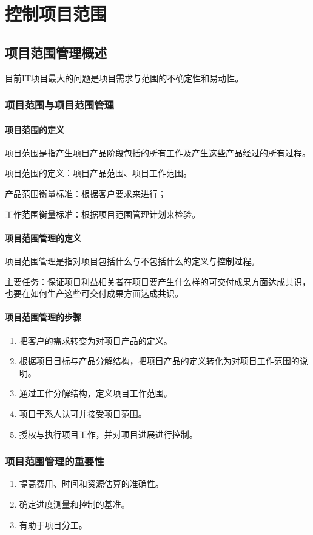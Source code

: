 \chapter{控制项目范围}
\section{项目范围管理概述}
目前IT项目最大的问题是项目需求与范围的不确定性和易动性。
\subsection{项目范围与项目范围管理}
\subsubsection*{项目范围的定义}
项目范围是指产生项目产品阶段包括的所有工作及产生这些产品经过的所有过程。
\par 项目范围的定义：项目产品范围、项目工作范围。
\par 产品范围衡量标准：根据客户要求来进行；
\par 工作范围衡量标准：根据项目范围管理计划来检验。
\subsubsection*{项目范围管理的定义}
项目范围管理是指对项目包括什么与不包括什么的定义与控制过程。 
\par 主要任务：保证项目利益相关者在项目要产生什么样的可交付成果方面达成共识，也要在如何生产这些可交付成果方面达成共识。
\subsubsection*{项目范围管理的步骤} 
\begin{enumerate}
	\item 把客户的需求转变为对项目产品的定义。
	\item 根据项目目标与产品分解结构，把项目产品的定义转化为对项目工作范围的说明。
	\item 通过工作分解结构，定义项目工作范围。
	\item 项目干系人认可并接受项目范围。
	\item 授权与执行项目工作，并对项目进展进行控制。
\end{enumerate}
\subsection{项目范围管理的重要性}
\begin{enumerate}
	\item 提高费用、时间和资源估算的准确性。 
	\item 确定进度测量和控制的基准。 
	\item 有助于项目分工。
\end{enumerate}
